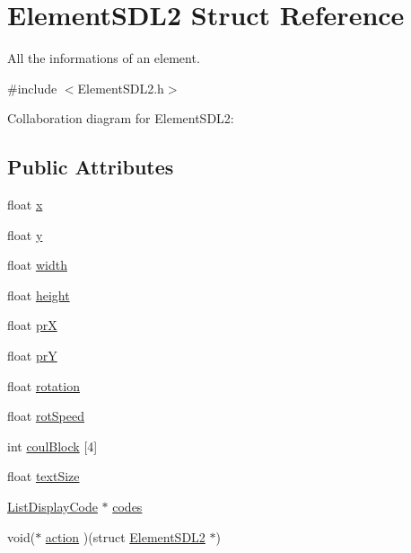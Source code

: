 \hypertarget{structElementSDL2}{}\section{Element\+S\+D\+L2 Struct Reference}
\label{structElementSDL2}


All the informations of an element.  




{\ttfamily \#include $<$Element\+S\+D\+L2.\+h$>$}



Collaboration diagram for Element\+S\+D\+L2\+:
\subsection*{Public Attributes}
\begin{DoxyCompactItemize}
\item 
float \hyperlink{structElementSDL2_a85c4f16793909cb2ab4fc3d1da0ad788}{x}
\item 
float \hyperlink{structElementSDL2_a07636d9e6dc09c88aaff9062b2db5278}{y}
\item 
float \hyperlink{structElementSDL2_a1dc0d58f7dfad658560111bd8d37a114}{width}
\item 
float \hyperlink{structElementSDL2_aa85848e696ee9420c7993d395ed883be}{height}
\item 
float \hyperlink{structElementSDL2_a9b522d7b8bf6b476d142fd0058aff66c}{prX}
\item 
float \hyperlink{structElementSDL2_a23b79d2468ca18e33071cd137f6961c6}{prY}
\item 
float \hyperlink{structElementSDL2_a8bbd5c157ceaba03f33b77e71daa7a79}{rotation}
\item 
float \hyperlink{structElementSDL2_a46a53dcb3d0d119e5df7cd276de2c4ae}{rot\+Speed}
\item 
int \hyperlink{structElementSDL2_a527fdb85c7fa55880dfcd9ddfdd4e0b9}{coul\+Block} \mbox{[}4\mbox{]}
\item 
float \hyperlink{structElementSDL2_a49a55a004e56ad15b5b0f0cb0045c83f}{text\+Size}
\item 
\hyperlink{structListDisplayCode}{List\+Display\+Code} $\ast$ \hyperlink{structElementSDL2_a60652c6e4cf3d38aadbc650a624d2999}{codes}
\item 
void($\ast$ \hyperlink{structElementSDL2_a86441847b7f6595e3405d6d9bbf1b8d9}{action} )(struct \hyperlink{structElementSDL2}{Element\+S\+D\+L2} $\ast$)
\item 

\end{DoxyCompactItemize}
